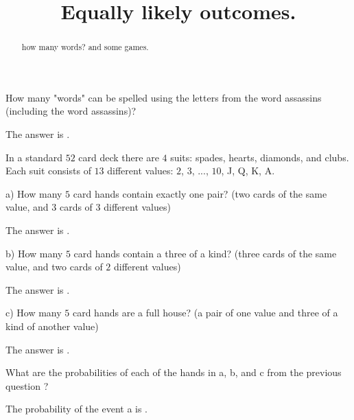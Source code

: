 \documentclass{ximera}
\title{Equally likely outcomes.}
\begin{document}
\begin{abstract}
how many words? and some games.
\end{abstract}
\maketitle

\begin{question}
How many "words" can be spelled using the letters from the word assassins (including the word assassins)?
     \begin{solution}
           The answer is .
     \end{solution}
\end{question}

In a standard $52$ card deck there are $4$ suits:  spades, hearts, diamonds, and clubs.  Each suit consists of $13$ different values:  $2$, $3$, ..., $10$, J, Q, K, A. 

\begin{question}
a)  How many $5$ card hands contain exactly one pair?  (two cards of the same value, and $3$ cards of $3$ different values)
     \begin{solution}
           The answer is .
     \end{solution}
\end{question}     

\begin{question}     
b)  How many $5$ card hands contain a three of a kind?  (three cards of the same value, and two cards of $2$ different values)
     \begin{solution}
           The answer is .
     \end{solution}
\end{question}     

\begin{question}     
c)  How many $5$ card hands are a full house?  (a pair of one value and three of a kind of another value)
     \begin{solution}
           The answer is .
     \end{solution}
\end{question}

What are the probabilities of each of the hands in a, b, and c from the previous question ?

\begin{question}
     \begin{solution}
           The probability of the event a is .
     \end{solution}
\end{question}
\end{document}
